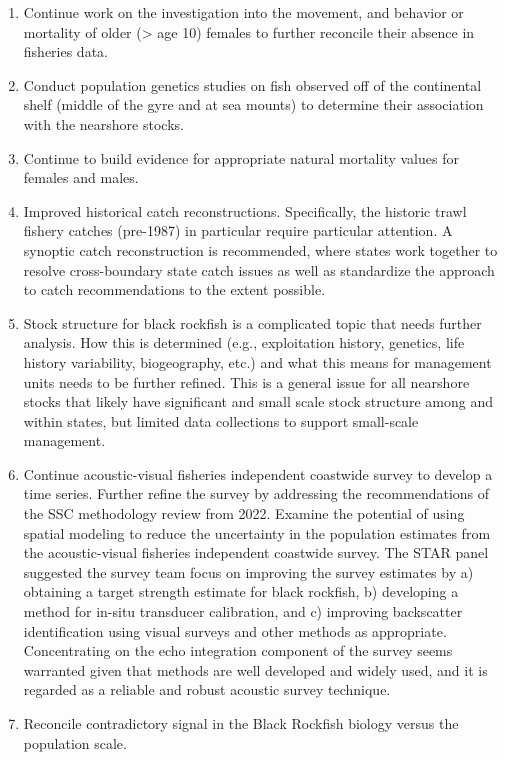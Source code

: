 \documentclass[11pt,
  english,
  letterpaper,
]{article}
\providecommand{\tightlist}{%
  \setlength{\itemsep}{0pt}\setlength{\parskip}{0pt}}
\providecommand{\tightlist}{%
  \setlength{\itemsep}{0pt}\setlength{\parskip}{0pt}}
\begin{document}
\begin{enumerate}
\def\labelenumi{\arabic{enumi}.}
\tightlist
\item
  Continue work on the investigation into the movement, and behavior or mortality of older (\textgreater{} age 10) females to further reconcile their absence in fisheries data.
\item
  Conduct population genetics studies on fish observed off of the continental shelf (middle of the gyre and at sea mounts) to determine their association with the nearshore stocks.
\item
  Continue to build evidence for appropriate natural mortality values for females and males.
\item
  Improved historical catch reconstructions. Specifically, the historic trawl fishery catches (pre-1987) in particular require particular attention. A synoptic catch reconstruction is recommended, where states work together to resolve cross-boundary state catch issues as well as standardize the approach to catch recommendations to the extent possible.
\item
  Stock structure for black rockfish is a complicated topic that needs further analysis. How this is determined (e.g., exploitation history, genetics, life history variability, biogeography, etc.) and what this means for management units needs to be further refined. This is a general issue for all nearshore stocks that likely have significant and small scale stock structure among and within states, but limited data collections to support small-scale management.
\item
  Continue acoustic-visual fisheries independent coastwide survey to develop a time series. Further refine the survey by addressing the recommendations of the SSC methodology review from 2022. Examine the potential of using spatial modeling to reduce the uncertainty in the population estimates from the acoustic-visual fisheries independent coastwide survey. The STAR panel suggested the survey team focus on improving the survey estimates by a) obtaining a target strength estimate for black rockfish, b) developing a method for in-situ transducer calibration, and c) improving backscatter identification using visual surveys and other methods as appropriate. Concentrating on the echo integration component of the survey seems warranted given that methods are well developed and widely used, and it is regarded as a reliable and robust acoustic survey technique.
\item
  Reconcile contradictory signal in the Black Rockfish biology versus the population scale.

\end{enumerate}
\end{document}
